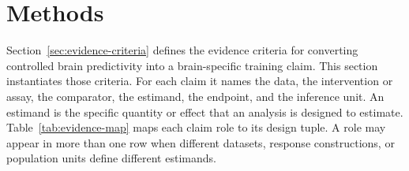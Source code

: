 \section{Methods}
\label{sec:framework}

Section~\ref{sec:evidence-criteria} defines the evidence criteria for converting controlled brain predictivity into a brain-specific training claim.
This section instantiates those criteria.
For each claim it names the data, the intervention or assay, the comparator, the estimand, the endpoint, and the inference unit.
An estimand is the specific quantity or effect that an analysis is designed to estimate.
Table~\ref{tab:evidence-map} maps each claim role to its design tuple.
A role may appear in more than one row when different datasets, response constructions, or population units define different estimands.

